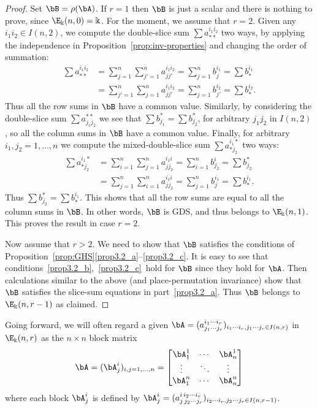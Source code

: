 \begin{proof}
Set $\bB = \rho(\bA)$. If $r=1$ then $\bB$ is just a scalar and there
is nothing to prove, since $\E_\Bbbk(n,0) = \Bbbk$. For the moment, we
assume that $r=2$. Given any $i_1i_2 \in I(n,2)$, we compute the
double-slice sum $\sum a^{i_1i_2}_{**}$ two ways, by applying the
independence in Proposition~\ref{prop:inv-properties} and changing
the order of summation:
\begin{align*}
\sum a^{i_1i_2}_{**} &= \sum_{j=1}^n \sum_{j'=1}^n a^{i_1i_2}_{jj'} =
\sum_{j=1}^n b^{i_1}_j = \sum b^{i_1}_*\\
&= \sum_{j'=1}^n \sum_{j=1}^n a^{i_1i_2}_{jj'} =
\sum_{j=1}^n b^{i_2}_{j'} = \sum b^{i_2}_* .
\end{align*}
Thus all the row sums in $\bB$ have a common value. Similarly, by
considering the double-slice sum $\sum a^{**}_{j_1j_2}$ we see that
$\sum b^*_{j_1} = \sum b^*_{j_2}$, for arbitrary $j_1j_2$ in $I(n,2)$,
so all the column sums in $\bB$ have a common value. Finally, for
arbitrary $i_1, j_2 = 1, \dots, n$ we compute the mixed-double-slice
sum $\sum a^{i_1*}_{*j_2}$ two ways:
\begin{align*}
\sum a^{i_1*}_{*j_2} &= \sum_{i=1}^n \sum_{j=1}^n a^{i_1i}_{jj_2} =
\sum_{i=1}^n b^{i}_{j_2} = \sum b^{*}_{j_2}\\
&= \sum_{j=1}^n \sum_{i=1}^n a^{i_1i}_{jj_2} =
\sum_{j=1}^n b^{i_1}_{j} = \sum b^{i_1}_* .
\end{align*}
Thus $\sum b^{*}_{j_2} = \sum b^{i_1}_{*}$. This shows that all the
row sums are equal to all the column sums in $\bB$. In other words,
$\bB$ is GDS, and thus belongs to $\E_\Bbbk(n,1)$. This proves the
result in case $r=2$.

Now assume that $r>2$. We need to show that $\bB$ satisfies the
conditions of Proposition~\ref{prop:GHS}\ref{prop3.2_a}--\ref{prop3.2_c}. It is easy to see
that conditions~\ref{prop3.2_b},~\ref{prop3.2_c}~hold for $\bB$ since they hold for
$\bA$. Then calculations similar to the above (and place-permutation
invariance) show that $\bB$ satisfies the slice-sum equations in part~\ref{prop3.2_a}. Thus $\bB$ belongs to $\E_\Bbbk(n,r-1)$ as claimed.
\end{proof}

Going forward, we will often regard a given $\bA = (a^{i_1
 \cdots i_r}_{j_1 \cdots j_r})_{i_1 \cdots i_r, j_1 \cdots j_r \in
 I(n,r)}$ in $\E_\Bbbk(n,r)$ as the $n \times n$ block matrix
\begin{equation}\label{eq:blocks}
\bA = (\bA^i_j)_{i,j = 1, \dots,n} = 
\begin{bmatrix}
 \bA^1_1 & \cdots & \bA^1_n \\
 \vdots & \ddots & \vdots \\
 \bA^n_1 & \cdots & \bA^n_n
\end{bmatrix}
\end{equation}
where each block $\bA^i_j$ is defined by $\bA^i_j = (a^{i\, i_2 \cdots
 i_r}_{j\, j_2 \cdots j_r})_{i_2 \cdots i_r, j_2 \cdots j_r \in
 I(n,r-1)}$.

